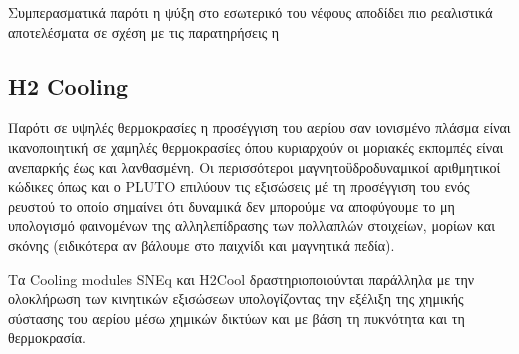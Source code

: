 Συμπερασματικά παρότι η ψύξη στο εσωτερικό του νέφους αποδίδει πιο ρεαλιστικά αποτελέσματα σε σχέση με τις παρατηρήσεις η 


%	



\newpage
	\subsection{H2 Cooling}
	
	Παρότι σε υψηλές θερμοκρασίες η προσέγγιση του αερίου σαν ιονισμένο πλάσμα είναι ικανοποιητική
	σε χαμηλές θερμοκρασίες όπου κυριαρχούν οι μοριακές εκπομπές είναι ανεπαρκής έως και λανθασμένη. Οι περισσότεροι μαγνητοϋδροδυναμικοί αριθμητικοί κώδικες όπως και ο PLUTO επιλύουν τις εξισώσεις μέ τη προσέγγιση του ενός ρευστού το οποίο σημαίνει ότι δυναμικά δεν μπορούμε να αποφύγουμε το μη υπολογισμό φαινομένων της αλληλεπίδρασης των πολλαπλών στοιχείων, μορίων και σκόνης (ειδικότερα αν βάλουμε στο παιχνίδι και μαγνητικά πεδία). 
	
	Tα Cooling modules SNEq και H2Cool δραστηριοποιούνται παράλληλα με την ολοκλήρωση των κινητικών εξισώσεων υπολογίζοντας την εξέλιξη της χημικής σύστασης του αερίου μέσω χημικών δικτύων και με βάση τη πυκνότητα και τη θερμοκρασία.  
	
%	
	
